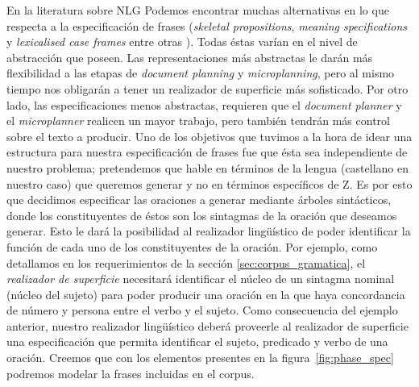 En la literatura sobre NLG Podemos encontrar muchas alternativas en lo que respecta a la especificación de frases (\textit{skeletal propositions}, \textit{meaning specifications} y \textit{lexicalised case frames} entre otras \cite{reiter_dale}). Todas éstas varían en el nivel de abstracción que poseen. Las representaciones más abstractas le darán más flexibilidad a las etapas de \textit{document planning} y \textit{microplanning}, pero al mismo tiempo nos obligarán a tener un realizador de superficie más sofisticado. Por otro lado, las especificaciones menos abstractas, requieren que el \textit{document planner} y el \textit{microplanner} realicen un mayor trabajo, pero también tendrán más control sobre el texto a producir. Uno de los objetivos que tuvimos a la hora de idear una estructura para nuestra especificación de frases fue que ésta sea independiente de nuestro problema; pretendemos que hable en términos de la lengua (castellano en nuestro caso) que queremos generar y no en términos específicos de Z. Es por esto que decidimos especificar las oraciones a generar mediante árboles sintácticos, donde los constituyentes de éstos son los sintagmas de la oración que deseamos generar. Esto le dará la posibilidad al realizador lingüístico de poder identificar la función de cada uno de los constituyentes de la oración. Por ejemplo, como detallamos en los requerimientos de la sección \ref{sec:corpus_gramatica}, el \emph{realizador de superficie} necesitará identificar el núcleo de un sintagma nominal (núcleo del sujeto) para poder producir una oración en la que haya concordancia de número y persona entre el verbo y el sujeto. Como consecuencia del ejemplo anterior, nuestro realizador lingüístico deberá proveerle al realizador de superficie una especificación que permita identificar el sujeto, predicado y verbo de una oración. Creemos que con los elementos presentes en la figura~\ref{fig:phase_spec} podremos modelar la frases incluidas en el corpus.

